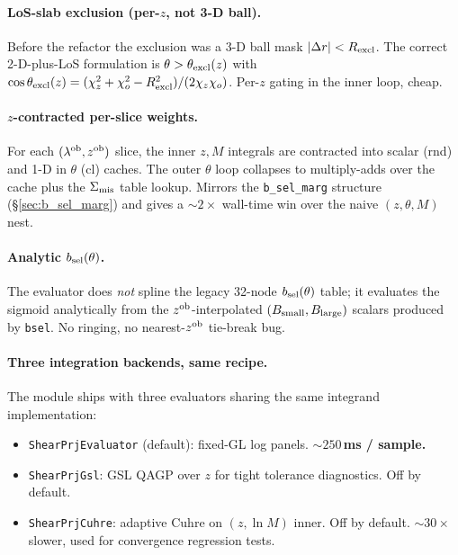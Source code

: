 \documentclass[a4paper, 11pt]{article}
\newcommand{\lob}{\lambda^{\rm ob}}
\newcommand{\zob}{z^{\rm ob}}
\newcommand{\Bsmall}{B_{\rm small}}
\newcommand{\Blarge}{B_{\rm large}}
\newcommand{\modname}[1]{\textcolor{kwcol}{\texttt{#1}}}
\begin{document}
\paragraph{LoS-slab exclusion (per-$z$, not 3-D ball).}  Before the
refactor the exclusion was a 3-D ball mask $|\Delta r| < R_{\rm excl}$.
The correct 2-D-plus-LoS formulation is $\theta > \theta_{\rm excl}(z)$
with $\cos\theta_{\rm excl}(z) = (\chi_z^2 + \chi_o^2 - R_{\rm excl}^2)/(2\chi_z\chi_o)$.
Per-$z$ gating in the inner loop, cheap.

\paragraph{$z$-contracted per-slice weights.}  For each $(\lob, \zob)$
slice, the inner $z, M$ integrals are contracted into scalar
(rnd) and 1-D in $\theta$ (cl) caches.  The outer $\theta$ loop
collapses to multiply-adds over the cache plus the
$\Sigma_{\rm mis}$ table lookup.  Mirrors the \modname{b\_sel\_marg}
structure (\S\ref{sec:b_sel_marg}) and gives a $\sim 2\times$
wall-time win over the naive $(z, \theta, M)$ nest.

\paragraph{Analytic $b_{\rm sel}(\theta)$.}  The evaluator does
\emph{not} spline the legacy 32-node $b_{\rm sel}(\theta)$ table; it
evaluates the sigmoid analytically from the $\zob$-interpolated
$(\Bsmall, \Blarge)$ scalars produced by \modname{bsel}.  No ringing,
no nearest-$\zob$ tie-break bug.

\paragraph{Three integration backends, same recipe.}  The module
ships with three evaluators sharing the same integrand
implementation:
\begin{itemize}
  \setlength\itemsep{2pt}
  \item \modname{ShearPrjEvaluator} (default): fixed-GL log panels.
    \textbf{$\sim 250$\,ms / sample.}
  \item \modname{ShearPrjGsl}: GSL QAGP over $z$ for tight tolerance
    diagnostics.  Off by default.
  \item \modname{ShearPrjCuhre}: adaptive Cuhre on $(z, \ln M)$ inner.
    Off by default.  $\sim 30\times$ slower, used for convergence
    regression tests.
\end{itemize}
\end{document}
